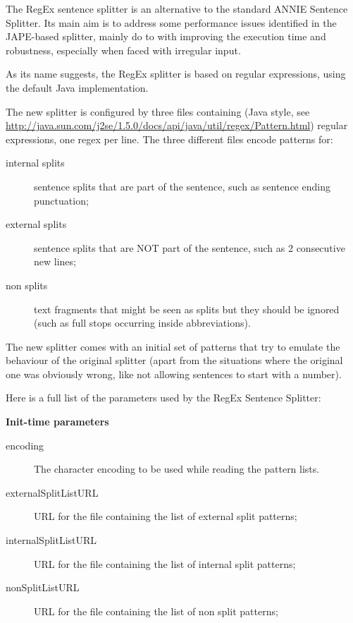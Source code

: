 The RegEx sentence splitter is an alternative to the standard ANNIE Sentence
Splitter. Its main aim is to address some performance issues identified in the
JAPE-based splitter, mainly do to with improving the execution time and
robustness, especially when faced with irregular input.

As its name suggests, the RegEx splitter is based on regular expressions,
using the default Java implementation.

The new splitter is configured by three files containing (Java style, 
see
\url{http://java.sun.com/j2se/1.5.0/docs/api/java/util/regex/Pattern.html})
regular expressions, one regex per line. The three different files  encode
patterns for:
\begin{description}
  \item[internal splits] sentence splits that are part of the sentence, such
  as sentence ending punctuation;
  \item[external splits] sentence splits that are NOT part of the sentence,
  such as 2 consecutive new lines;
  \item[non splits] text fragments that might be seen as splits but they
  should be ignored (such as full stops occurring inside abbreviations).
\end{description}

The new splitter comes with an initial set of patterns that try to 
emulate the behaviour of the original splitter (apart from the 
situations where the original one was obviously wrong, like not allowing 
sentences to start with a number).

Here is a full list of the parameters used by the RegEx Sentence Splitter:

{\bf Init-time parameters}
\begin{description}
\item[encoding] The character encoding to be used while reading the pattern 
lists.
\item[externalSplitListURL] URL for the file containing the list of external
split patterns;
\item[internalSplitListURL] URL for the file containing the list of internal
split patterns;
\item[nonSplitListURL] URL for the file containing the list of non split
patterns;
\end{description}

